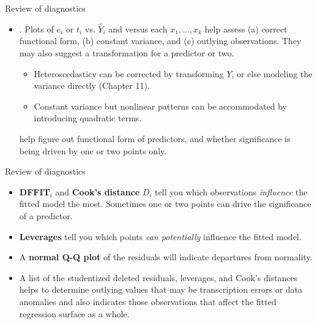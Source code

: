 \documentclass{beamer}
\begin{document}
\begin{frame}{Review of diagnostics}
\begin{itemize}
\item {}. Plots of $e_i$ or $t_i$ vs. $\hat{Y}_i$ and versus each $x_1, \ldots, x_k$ help assess (a) correct functional form, (b) constant
variance, and (c) outlying observations. %
They may also suggest a transformation for a predictor or two.
\begin{itemize}
\item\pause Heteroscedasticy can be corrected by transforming $Y$, or else
modeling the variance directly (Chapter 11).
\item\pause Constant variance but nonlinear patterns can be accommodated by introducing quadratic terms. 
\end{itemize}

\pause{} help figure out functional form of predictors, and whether significance is being driven by one or two points only.
\end{itemize}
\end{frame}

\begin{frame}{Review of diagnostics}
\begin{itemize}
\item \textbf{DFFIT}$_i$ and \textbf{Cook's distance} $D_i$ tell you which observations
\textit{influence} the fitted model the most. Sometimes one or two points can drive the significance of a predictor.
\item\pause \textbf{Leverages} tell you which points \textit{can potentially} influence the fitted model. %
\item\pause A \textbf{normal Q-Q plot} of the residuals will indicate  departures from normality.
\item\pause A list of the studentized deleted residuals, leverages, and Cook's distances helps to determine outlying values that may
be transcription errors or data anomalies and also indicates those observations that affect the fitted regression surface as
a whole.
\end{itemize}
\end{frame}
\end{document}
